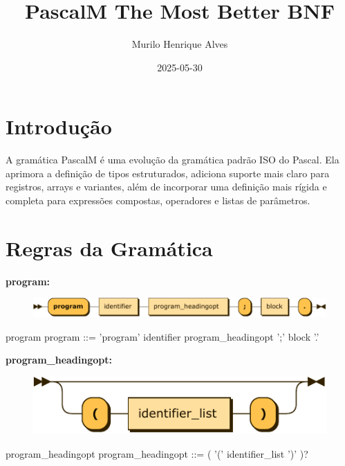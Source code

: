 \documentclass[10pt,a4paper,twoside]{article}
\title{PascalM The Most Better BNF}
\author{Murilo Henrique Alves}
\date{2025-05-30}
\newcounter{grammarbox}[section]
\begin{document}
\maketitle

\section{Introdução}
A gramática PascalM é uma evolução da gramática padrão ISO do Pascal.
Ela aprimora a definição de tipos estruturados, adiciona suporte mais claro
para registros, arrays e variantes, além de incorporar uma definição mais
rígida e completa para expressões compostas, operadores e listas de parâmetros.

\section{Regras da Gramática}

\textbf{program:}

\begin{figure}[H]
\centering
\includegraphics{diagram/program.pdf}

\end{figure}

\begin{grammarbox}{program}
\vspace{0.5em}
program  ::= 'program' identifier program\_headingopt ';' block '.'
\end{grammarbox}

\textbf{program\_headingopt:}

\begin{figure}[H]
\centering
\includegraphics{diagram/program_headingopt.pdf}

\end{figure}

\begin{grammarbox}{program\_headingopt}
\vspace{0.5em}
program\_headingopt
         ::= ( '(' identifier\_list ')' )?
\end{grammarbox}
\end{document}
